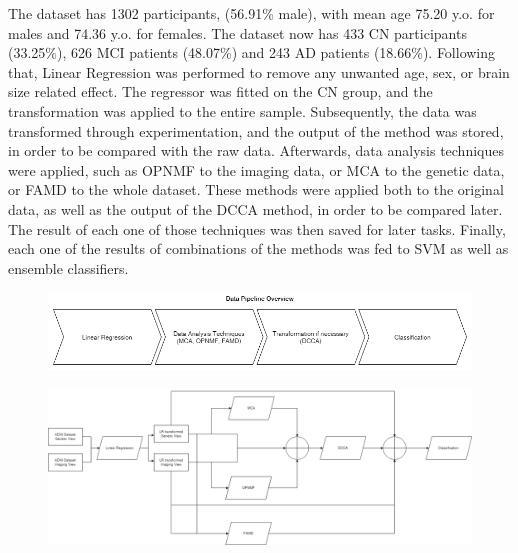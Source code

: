{The dataset has 1302 participants, (56.91\% male), with mean age 75.20 y.o. for males and 74.36 y.o. for females. The dataset now has 433 CN participants (33.25\%), 626 MCI patients (48.07\%) and 243 AD patients (18.66\%). Following that, Linear Regression was performed to remove any unwanted age, sex, or brain size related effect. The regressor was fitted on the CN group, and the transformation was applied to the entire sample. Subsequently, the data was transformed through experimentation, and the output of the method was stored, in order to be compared with the raw data. Afterwards, data analysis techniques were applied, such as OPNMF to the imaging data, or MCA to the genetic data, or FAMD to the whole dataset. These methods were applied both to the original data, as well as the output of the DCCA method, in order to be compared later. The result of each one of those techniques was then saved for later tasks. Finally, each one of the results of combinations of the methods was fed to SVM as well as ensemble classifiers. 
\begin{figure}[H]
    \centering
    \includegraphics[width=\textwidth]{figures/Methodology/Data_Pipeline_Overview.png}
    \caption{}
\end{figure}
\begin{figure}[H]
    \centering
    \includegraphics[width=\textwidth]{figures/Methodology/Data_Pipeline_Diagram_1.png}
    \caption{}
\end{figure}
\bigbreak
}